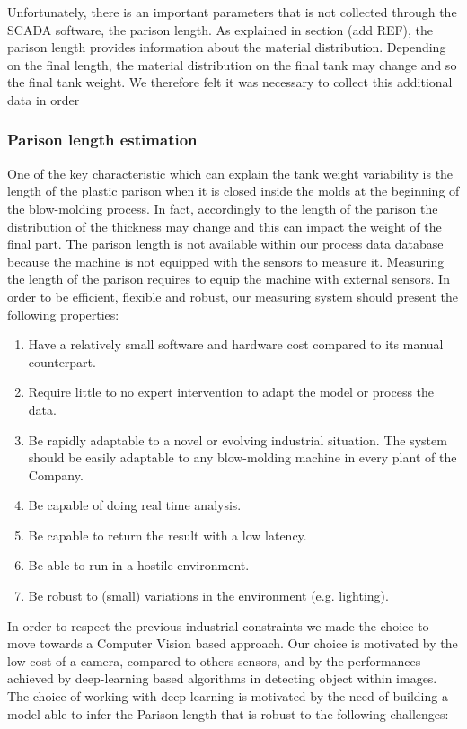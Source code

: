 Unfortunately, there is an important parameters that is not collected through the SCADA software, the parison length. As explained in section (add REF), the parison length provides information about the material distribution. Depending on the final length, the material distribution on the final tank may change and so the final tank weight. We therefore felt it was necessary to collect this additional data in order    

\subsubsection{Parison length estimation}

One of the key characteristic which can explain the tank weight variability is the length of the plastic parison when it is closed inside the molds at the beginning of the blow-molding process. In fact, accordingly to the length of the parison the distribution of the thickness may change and this can impact the weight of the final part. The parison length is not available within our process data database because the machine is not equipped with the sensors to measure it. Measuring the length of the parison requires to equip the machine with external sensors.
In order to be efficient, flexible and robust, our measuring system should present the following properties:

\begin{enumerate}
    \item Have a relatively small software and hardware cost compared to its manual counterpart.
    \item Require little to no expert intervention to adapt the model or process the data.
    \item Be rapidly adaptable to a novel or evolving industrial situation. The system should be easily adaptable to any blow-molding machine in every plant of the Company.
    \item Be capable of doing real time analysis.
    \item Be capable to return the result with a low latency.
    \item Be able to run in a hostile environment.
    \item Be robust to (small) variations in the environment (e.g. lighting).
\end{enumerate}

In order to respect the previous industrial constraints we made the choice to move towards a Computer Vision based approach. Our choice is motivated by the low cost of a camera, compared to others sensors, and by the performances achieved by deep-learning based algorithms in detecting object within images. The choice of working with deep  learning is motivated by the need of building a model able to infer the Parison length that is robust to the following challenges:

